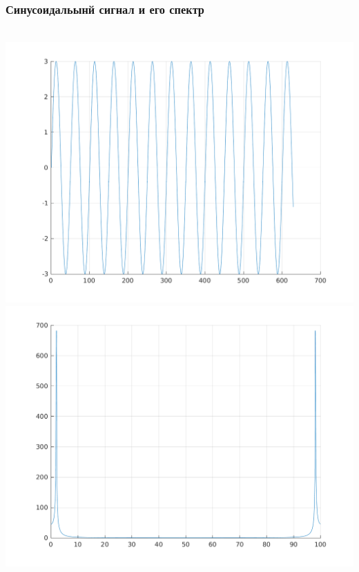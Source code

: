 \documentclass[a4paper]{article}
\begin{document}
\subsubsection{Синусоидальынй сигнал и его спектр}
\\
\includegraphics[scale=0.7]{lab3/figures/figure_0.png}\\
\includegraphics[scale=0.7]{lab3/figures/figure_1.png}\\
\end{document}
